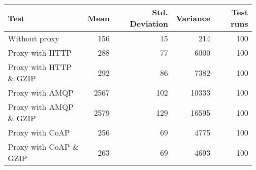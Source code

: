 \begin{tabular}{lrrrr}
\hline
 Test                   &   Mean &   Std. Deviation &   Variance &   Test runs \\
\hline
 Without proxy          &    156 &               15 &        214 &         100 \\
 Proxy with HTTP        &    288 &               77 &       6000 &         100 \\
 Proxy with HTTP \& GZIP &    292 &               86 &       7382 &         100 \\
 Proxy with AMQP        &   2567 &              102 &      10333 &         100 \\
 Proxy with AMQP \& GZIP &   2579 &              129 &      16595 &         100 \\
 Proxy with CoAP        &    256 &               69 &       4775 &         100 \\
 Proxy with CoAP \& GZIP &    263 &               69 &       4693 &         100 \\
\hline
\end{tabular}